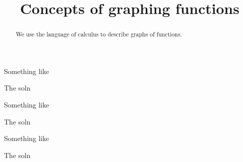 \documentclass{ximera}
\title[Dig-In:]{Concepts of graphing functions}
\begin{document}
\begin{abstract}
  We use the language of calculus to describe graphs of functions.
\end{abstract}


\begin{example}
  Something like
  \begin{explanation}
    The soln
  \end{explanation}
\end{example}


\begin{example}
  Something like
  \begin{explanation}
    The soln
  \end{explanation}
\end{example}


\begin{example}
  Something like
  \begin{explanation}
    The soln
  \end{explanation}
\end{example}


\end{document}

